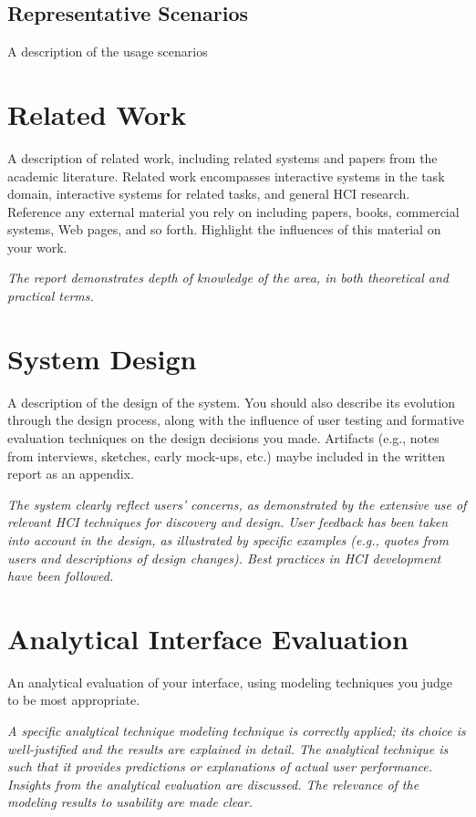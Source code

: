 \documentclass[conference]{IEEEtran}
\begin{document}
\subsection{Representative Scenarios}
A description of the usage scenarios


\section{Related Work}
A description of related work, including related systems and papers from the academic literature. Related work encompasses interactive systems in the task domain, interactive systems for related tasks, and general HCI research. Reference any external material you rely on including papers, books, commercial systems, Web pages, and so forth. Highlight the influences of this material on your work. 

\emph{The report demonstrates depth of knowledge of the area, in both theoretical and practical terms.}

\section{System Design}
A description of the design of the system. You should also describe its evolution through the design process, along with the influence of user testing and formative evaluation techniques on the design decisions you made. Artifacts (e.g., notes from interviews, sketches, early mock-ups, etc.) maybe included in the written report as an appendix. 

\emph{The system clearly reflect users' concerns, as demonstrated by the extensive use of relevant HCI techniques for discovery and design. User feedback has been taken into account in the design, as illustrated by specific examples (e.g., quotes from users and descriptions of design changes). Best practices in HCI development have been followed.}


\section{Analytical Interface Evaluation}
 An analytical evaluation of your interface, using modeling techniques you judge to be most appropriate. 
 
\emph{A specific analytical technique modeling technique is correctly applied; its choice is well-justified and the results are explained in detail. The analytical technique is such that it provides predictions or explanations of actual user performance. Insights from the analytical evaluation are discussed. The relevance of the modeling results to usability are made clear.}
\end{document}
